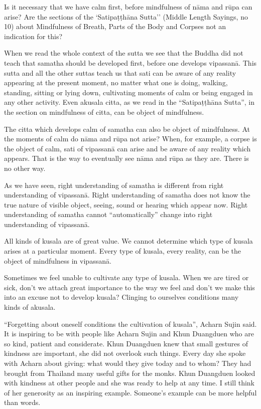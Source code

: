Is it necessary that we have calm first, before mindfulness of nāma and
rūpa can arise? Are the sections of the `Satipaṭṭhāna Sutta'' (Middle
Length Sayings, no 10) about Mindfulness of Breath, Parts of the Body
and Corpses not an indication for this?

When we read the whole context of the sutta we see that the Buddha did
not teach that samatha should be developed first, before one develops
vipassanā. This sutta and all the other suttas teach us that sati can be
aware of any reality appearing at the present moment, no matter what one
is doing, walking, standing, sitting or lying down, cultivating moments
of calm or being engaged in any other activity. Even akusala citta, as
we read in the ``Satipaṭṭhāna Sutta'', in the section on mindfulness of
citta, can be object of mindfulness.

The citta which develops calm of samatha can also be object of
mindfulness. At the moments of calm do nāma and rūpa not arise? When,
for example, a corpse is the object of calm, sati of vipassanā can arise
and be aware of any reality which appears. That is the way to eventually
see nāma and rūpa as they are. There is no other way.

As we have seen, right understanding of samatha is different from right
understanding of vipassanā. Right understanding of samatha does not know
the true nature of visible object, seeing, sound or hearing which appear
now. Right understanding of samatha cannot ``automatically'' change into
right understanding of vipassanā.

All kinds of kusala are of great value. We cannot determine which type
of kusala arises at a particular moment. Every type of kusala, every
reality, can be the object of mindfulness in vipassanā.

Sometimes we feel unable to cultivate any type of kusala. When we are
tired or sick, don't we attach great importance to the way we feel and
don't we make this into an excuse not to develop kusala? Clinging to
ourselves conditions many kinds of akusala.

``Forgetting about oneself conditions the cultivation of kusala'',
Acharn Sujin said. It is inspiring to be with people like Acharn Sujin
and Khun Duangduen who are so kind, patient and considerate. Khun
Duangduen knew that small gestures of kindness are important, she did
not overlook such things. Every day she spoke with Acharn about giving:
what would they give today and to whom? They had brought from Thailand
many useful gifts for the monks. Khun Duangduen looked with kindness at
other people and she was ready to help at any time. I still think of her
generosity as an inspiring example. Someone's example can be more
helpful than words.

